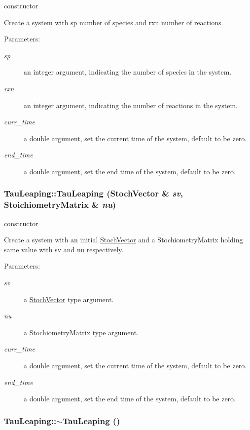 constructor 

Create a system with sp number of species and rxn number of reactions. \begin{Desc}
\item[Parameters:]
\begin{description}
\item[{\em sp}]an integer argument, indicating the number of species in the system. \item[{\em rxn}]an integer argument, indicating the number of reactions in the system. \item[{\em curr\_\-time}]a double argument, set the current time of the system, default to be zero. \item[{\em end\_\-time}]a double argument, set the end time of the system, default to be zero. \end{description}
\end{Desc}
\hypertarget{class_tau_leaping_b3cbfbd6c09180620933fb1eeb5d18e9}{
\subsubsection{\setlength{\rightskip}{0pt plus 5cm}TauLeaping::TauLeaping ({\bf StochVector} \& {\em sv}, \/  {\bf StoichiometryMatrix} \& {\em nu})}}
\label{class_tau_leaping_b3cbfbd6c09180620933fb1eeb5d18e9}


constructor 

Create a system with an initial \hyperlink{class_stoch_vector}{StochVector} and a StochiometryMatrix holding same value with sv and nu respectively. \begin{Desc}
\item[Parameters:]
\begin{description}
\item[{\em sv}]a \hyperlink{class_stoch_vector}{StochVector} type argument. \item[{\em nu}]a StochiometryMatrix type argument. \item[{\em curr\_\-time}]a double argument, set the current time of the system, default to be zero. \item[{\em end\_\-time}]a double argument, set the end time of the system, default to be zero. \end{description}
\end{Desc}
\hypertarget{class_tau_leaping_fae28db193468defe60a2d27a4e0b0bd}{
\subsubsection{\setlength{\rightskip}{0pt plus 5cm}TauLeaping::$\sim$TauLeaping ()}}
\label{class_tau_leaping_fae28db193468defe60a2d27a4e0b0bd}


